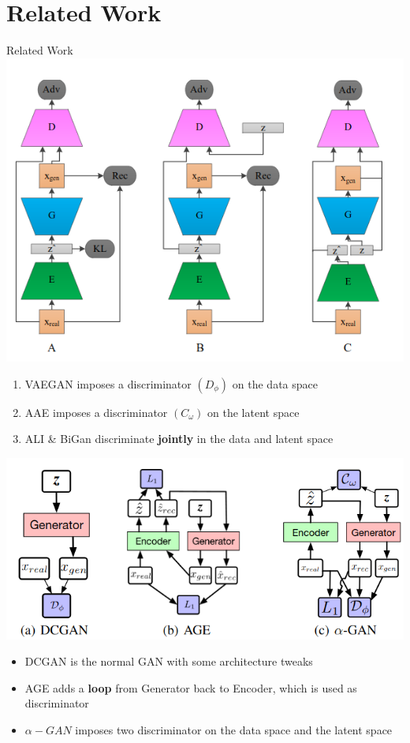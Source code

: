 \documentclass[compress]{beamer}
\begin{document}
\section{Related Work}
\begin{frame}[allowframebreaks]{Related Work}
    \includegraphics[scale=0.45]{relatedwork}
    \begin{enumerate}[A]
        \item VAEGAN imposes a discriminator $(D_\phi)$ on the data space
        \item AAE imposes a discriminator $(C_\omega)$ on the latent space
        \item ALI \& BiGan discriminate \textbf{jointly} in the data and latent space
    \end{enumerate}
    \framebreak
    \includegraphics[scale=0.5]{relatedwork2}
    \begin{itemize}
        \item DCGAN is the normal GAN with some architecture tweaks
        \item AGE adds a \textbf{loop} from Generator back to Encoder, which is used as discriminator
        \item $\alpha-GAN$ imposes two discriminator on the data space and the latent space
    \end{itemize}
\end{frame}
\end{document}
